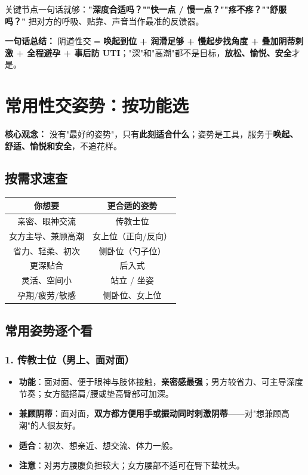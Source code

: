\documentclass[12pt,UTF8,openany]{ctexbook}
\begin{document}
关键节点一句话就够：\textbf{"深度合适吗？""快一点 / 慢一点？""疼不疼？""舒服吗？"} 把对方的呼吸、贴靠、声音当作最准的反馈器。

\vspace{1em}
\noindent\textbf{一句话总结：} 阴道性交 = \textbf{唤起到位 + 润滑足够 + 慢起步找角度 + 叠加阴蒂刺激 + 全程避孕 + 事后防 UTI}；"深"和"高潮"都不是目标，\textbf{放松、愉悦、安全}才是。

\chapter{常用性交姿势：按功能选}
\label{chap:positions}

\noindent\textbf{核心观念：} 没有"最好的姿势"，只有\textbf{此刻适合什么}；姿势是工具，服务于\textbf{唤起、舒适、愉悦和安全}，不追花样。

\section{按需求速查}

\begin{tabularx}{\textwidth}{C C}
\toprule
你想要 & 更合适的姿势 \\
\midrule
亲密、眼神交流 & 传教士位 \\
女方主导、兼顾高潮 & 女上位（正向/反向） \\
省力、轻柔、初次 & 侧卧位（勺子位） \\
更深贴合 & 后入式 \\
灵活、空间小 & 站立 / 坐姿 \\
孕期/疲劳/敏感 & 侧卧位、女上位 \\
\bottomrule
\end{tabularx}

\section{常用姿势逐个看}

\subsection*{1. 传教士位（男上、面对面）}
\begin{itemize}[leftmargin=2em,itemsep=0.3em]
  \item \textbf{功能}：面对面、便于眼神与肢体接触，\textbf{亲密感最强}；男方较省力、可主导深度节奏；女方腿搭肩/腰或垫高臀部可加深。
  \item \textbf{兼顾阴蒂}：面对面，\textbf{双方都方便用手或振动同时刺激阴蒂}——对"想兼顾高潮"的人很友好。
  \item \textbf{适合}：初次、想亲近、想交流、体力一般。
  \item \textbf{注意}：对男方腰腹负担较大；女方腰部不适可在臀下垫枕头。
\end{itemize}
\end{document}
